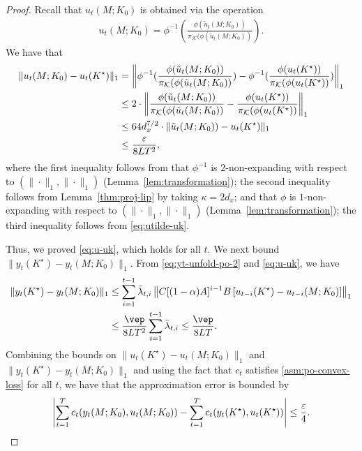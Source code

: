 \begin{proof}
Recall that $u_t(M;K_0)$ is obtained via the operation
\begin{align*}
u_t(M;K_0)=\phi^{-1}(\frac{\phi( \tilde{u}_t(M;K_0))}{\pi_{\mathcal{K}}(\phi( \tilde{u}_t(M;K_0))}).
\end{align*}
We have that
\begin{align*}
\|u_t(M;K_0)-u_t(K^{\star})\|_1&=\left\|\phi^{-1}(\frac{\phi( \tilde{u}_t(M;K_0))}{\pi_{\mathcal{K}}(\phi( \tilde{u}_t(M;K_0))})-\phi^{-1}(\frac{\phi( u_t(K^{\star}))}{\pi_{\mathcal{K}}(\phi( u_t(K^{\star}))})\right\|_1\\
&\le 2\cdot \left\|\frac{\phi( \tilde{u}_t(M;K_0))}{\pi_{\mathcal{K}}(\phi( \tilde{u}_t(M;K_0))}-\frac{\phi( u_t(K^{\star}))}{\pi_{\mathcal{K}}(\phi( u_t(K^{\star}))}\right\|_1\\
&\le 64 d_x^{7/2}\cdot \|\tilde{u}_t(M;K_0))-u_t(K^{\star})\|_1\\
&\le \frac{\varepsilon }{8LT^2},
\end{align*}
where the first inequality follows from that $\phi^{-1}$ is $2$-non-expanding with respect to $(\|\cdot\|_1, \|\cdot\|_1)$ (Lemma~\ref{lem:transformation}); the second inequality follows from Lemma~\ref{thm:proj-lip} by taking $\kappa=2d_x$; and that $\phi$ is $1$-non-expanding with respect to $(\|\cdot\|_1, \|\cdot\|_1)$ (Lemma~\ref{lem:transformation}); the third inequality follows from \cref{eq:utilde-uk}.

Thus, we proved \cref{eq:u-uk}, which
holds for all $t$. We next bound $\|y_t(K^{\star})-y_t(M;K_0)\|_1$.
From \cref{eq:yt-unfold-po-2} and \cref{eq:u-uk}, we have
\begin{align*}
\|y_t(K^{\star})-y_t(M;K_0)\|_1
&\le \sum_{i=1}^{t-1}\bar{\lambda}_{t,i}\left\|C[(1-\alpha)A]^{i-1}B\left[u_{t-i}(K^{\star})-u_{t-i}(M;K_0)\right]\right\|_1 \\ 
&\leq \frac{\vep}{8 LT^2} \sum_{i=1}^{t-1}\bar\lambda_{t,i} \leq \frac{\vep}{8LT}.
\end{align*}
Combining the bounds on $\|u_{t}(K^{\star})-u_t(M;K_0)\|_1$ and $\|y_t(K^{\star})-y_t(M;K_0)\|_1$ and using the fact that $c_t$ satisfies \cref{asm:po-convex-loss} for all $t$, we have that the approximation error is bounded by
\begin{align}
\label{eq:c-approx}
\left|\sum_{t=1}^T c_t(y_t(M;K_0),u_t(M;K_0))-\sum_{t=1}^Tc_t(y_t(K^{\star}),u_t(K^{\star}))\right|\le \frac{\varepsilon}{4}.
\end{align}

\end{proof}
